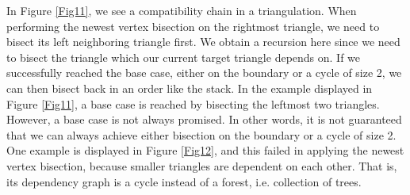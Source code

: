     In Figure \ref{Fig11}, we see a compatibility chain in a triangulation. When performing the newest vertex bisection on the rightmost triangle, we need to bisect its left neighboring triangle first. We obtain a recursion here since we need to bisect the triangle which our current target triangle depends on. If we successfully reached the base case, either on the boundary or a cycle of size 2, we can then bisect back in an order like the stack. In the example displayed in Figure \ref{Fig11}, a base case is reached by bisecting the leftmost two triangles. However, a base case is not always promised. In other words, it is not guaranteed that we can always achieve either bisection on the boundary or a cycle of size 2. One example is displayed in Figure \ref{Fig12}, and this failed in applying the newest vertex bisection, because smaller triangles are dependent on each other. That is, its dependency graph is a cycle instead of a forest, i.e. collection of trees.

